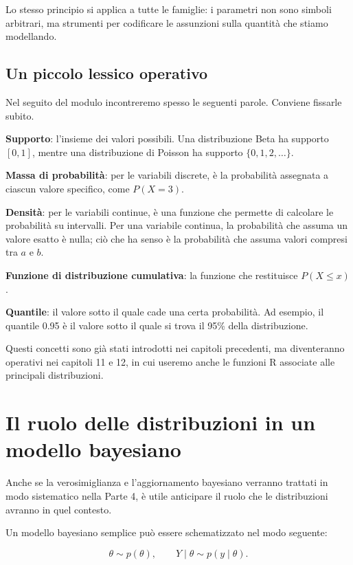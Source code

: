 \documentclass[
  italian,
  letterpaper,
  a4paper,
  11pt,
  open=any]{scrbook}
\theoremstyle{plain}
\theoremstyle{definition}
\theoremstyle{definition}
\theoremstyle{remark}
\begin{document}
Lo stesso principio si applica a tutte le famiglie: i parametri non sono
simboli arbitrari, ma strumenti per codificare le assunzioni sulla
quantità che stiamo modellando.

\subsection{Un piccolo lessico
operativo}\label{un-piccolo-lessico-operativo}

Nel seguito del modulo incontreremo spesso le seguenti parole. Conviene
fissarle subito.

\textbf{Supporto}: l'insieme dei valori possibili. Una distribuzione
Beta ha supporto \([0,1]\), mentre una distribuzione di Poisson ha
supporto \(\{0,1,2,\ldots\}\).

\textbf{Massa di probabilità}: per le variabili discrete, è la
probabilità assegnata a ciascun valore specifico, come \(P(X = 3)\).

\textbf{Densità}: per le variabili continue, è una funzione che permette
di calcolare le probabilità su intervalli. Per una variabile continua,
la probabilità che assuma un valore esatto è nulla; ciò che ha senso è
la probabilità che assuma valori compresi tra \(a\) e \(b\).

\textbf{Funzione di distribuzione cumulativa}: la funzione che
restituisce \(P(X \leq x)\).

\textbf{Quantile}: il valore sotto il quale cade una certa probabilità.
Ad esempio, il quantile 0.95 è il valore sotto il quale si trova il 95\%
della distribuzione.

Questi concetti sono già stati introdotti nei capitoli precedenti, ma
diventeranno operativi nei capitoli 11 e 12, in cui useremo anche le
funzioni R associate alle principali distribuzioni.

\section{Il ruolo delle distribuzioni in un modello
bayesiano}\label{sec-distribution-roles-bayes}

Anche se la verosimiglianza e l'aggiornamento bayesiano verranno
trattati in modo sistematico nella Parte 4, è utile anticipare il ruolo
che le distribuzioni avranno in quel contesto.

Un modello bayesiano semplice può essere schematizzato nel modo
seguente:

\[
\theta \sim p(\theta),
\qquad
Y \mid \theta \sim p(y \mid \theta).
\]
\end{document}
